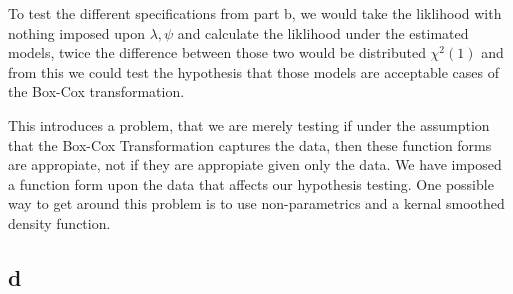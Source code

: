 \documentclass[10pt]{paper}\usepackage[]{graphicx}\usepackage[]{color}
\begin{document}
To test the different specifications from part b, we would take the
liklihood with nothing imposed upon $\lambda, \psi$ and calculate the liklihood
under the estimated models, twice the difference between those two
would be distributed $\chi^2 (1)$ and from this we could test the
hypothesis that those models are acceptable cases of the Box-Cox
transformation.

This introduces a problem, that we are merely testing if under the
assumption that the Box-Cox Transformation captures the data, then
these function forms are appropiate, not if they are appropiate given
only the data. We have imposed a function form upon the data that
affects our hypothesis testing. One possible way to get around this
problem is to use non-parametrics and a kernal smoothed density
function.

\subsection*{d}
\end{document}
